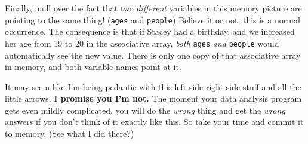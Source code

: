 Finally, mull over the fact that two \textit{different} variables in this
memory picture are pointing to the same thing! (\texttt{ages} and
\texttt{people}) Believe it or not, this is a normal occurrence. The
consequence is that if Stacey had a birthday, and we increased her age from 19
to 20 in the associative array, \textit{both} \texttt{ages} \textit{and}
\texttt{people} would automatically see the new value. There is only one copy
of that associative array in memory, and both variable names point at it.

It may seem like I'm being pedantic with this left-side-right-side stuff and
all the little arrows. \textbf{I promise you I'm not.} The moment your data
analysis program gets even mildly complicated, you will do the \textit{wrong}
thing and get the \textit{wrong} answers if you don't think of it exactly like
this. So take your time and commit it to memory. (See what I did there?)
